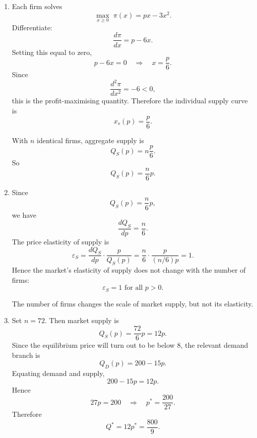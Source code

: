 \documentclass[12pt]{article}
\begin{document}
\begin{enumerate}[label=(\alph*)]
    For \(0\le p\le 8\), both types buy:
    \begin{align*}
    Q_D(p)
    &=80\left(2-\frac{p}{8}\right)+80\left(\frac12-\frac{p}{16}\right)\\
    &=160-10p+40-5p\\
    &=200-15p.
    \end{align*}

    For \(8<p\le 16\), only Type 1 buys:
    \[
    Q_D(p)=80\left(2-\frac{p}{8}\right)=160-10p.
    \]

    For \(p>16\), nobody buys:
    \[
    Q_D(p)=0.
    \]

    Hence
    \[
    \boxed{
    Q_D(p)=
    \begin{cases}
    200-15p, & 0\le p\le 8,\\[0.4em]
    160-10p, & 8<p\le 16,\\[0.4em]
    0, & p>16.
    \end{cases}}
    \]

    \item
    Each firm solves
    \[
    \max_{x\ge 0}\; \pi(x)=px-3x^2.
    \]
    Differentiate:
    \[
    \frac{d\pi}{dx}=p-6x.
    \]
    Setting this equal to zero,
    \[
    p-6x=0
    \quad\Longrightarrow\quad
    x=\frac{p}{6}.
    \]
    Since
    \[
    \frac{d^2\pi}{dx^2}=-6<0,
    \]
    this is the profit-maximising quantity. Therefore the individual supply curve is
    \[
    \boxed{x_s(p)=\frac{p}{6}.}
    \]

    With \(n\) identical firms, aggregate supply is
    \[
    Q_S(p)=n\frac{p}{6}.
    \]
    So
    \[
    \boxed{Q_S(p)=\frac{n}{6}p.}
    \]

    \item
    Since
    \[
    Q_S(p)=\frac{n}{6}p,
    \]
    we have
    \[
    \frac{dQ_S}{dp}=\frac{n}{6}.
    \]
    The price elasticity of supply is
    \[
    \varepsilon_S=\frac{dQ_S}{dp}\cdot \frac{p}{Q_S(p)}
    =\frac{n}{6}\cdot \frac{p}{(n/6)p}=1.
    \]
    Hence the market’s elasticity of supply does not change with the number of firms:
    \[
    \boxed{\varepsilon_S=1\text{ for all }p>0.}
    \]

    The number of firms changes the scale of market supply, but not its elasticity.

    \item
    Set \(n=72\). Then market supply is
    \[
    Q_S(p)=\frac{72}{6}p=12p.
    \]
    Since the equilibrium price will turn out to be below 8, the relevant demand branch is
    \[
    Q_D(p)=200-15p.
    \]
    Equating demand and supply,
    \[
    200-15p=12p.
    \]
    Hence
    \[
    27p=200
    \quad\Longrightarrow\quad
    p^*=\frac{200}{27}.
    \]
    Therefore
    \[
    Q^*=12p^*=\frac{800}{9}.
    \]


\end{enumerate}
\end{document}
